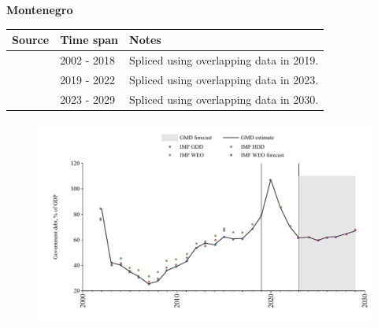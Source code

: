 \documentclass[12pt,a4paper,landscape]{article}
\begin{document}
\begin{adjustbox}{max totalsize={\paperwidth}{\paperheight},center}
\begin{minipage}[t][\textheight][t]{\textwidth}
\vspace*{0.5cm}
{}
\begin{center}
{\Large\bfseries Montenegro}
\end{center}
\vspace{0.5cm}
\begin{table}[H]
\centering
\small
\begin{tabular}{|l|l|l|}
\hline
\textbf{Source} & \textbf{Time span} & \textbf{Notes} \\
\hline
\rowcolor{white}\cite{IMF_GDD}& 2002 - 2018 &Spliced using overlapping data in 2019.\\
\rowcolor{lightgray}\cite{IMF_WEO}& 2019 - 2022 &Spliced using overlapping data in 2023.\\
\rowcolor{white}\cite{IMF_WEO_forecast}& 2023 - 2029 &Spliced using overlapping data in 2030.\\
\hline
\end{tabular}
\end{table}
\begin{figure}[H]
\centering
\includegraphics[width=\textwidth,height=0.6\textheight,keepaspectratio]{graphs/MNE_govdebt_GDP.pdf}
\end{figure}
\end{minipage}
\end{adjustbox}
\end{document}
